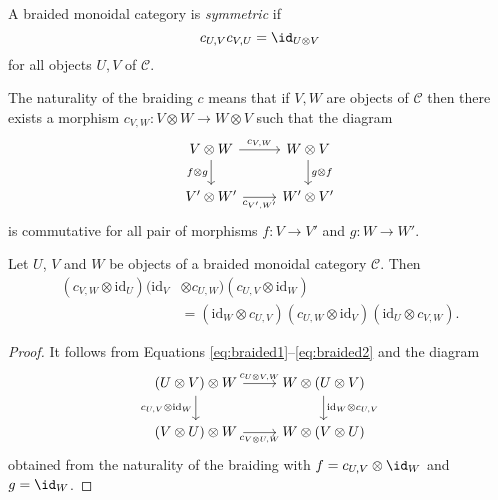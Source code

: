 \documentclass[12pt]{amsproc}
\newcommand{\ydH}{\prescript{H}{H}{\mathcal{YD}}}
\begin{document}
\begin{definition}
A braided monoidal category is \emph{symmetric} if 
\[
c_{U,V}c_{V,U}=\id_{U\otimes V}
\]
for all objects $U,V$ of $\mathcal{C}$.
\end{definition}

The naturality of the braiding $c$ means that if $V,W$ are objects
of $\mathcal{C}$ then there exists a morphism $c_{V,W}:V\otimes W\to W\otimes V$
such that the diagram 
\[
\begin{tikzcd}
V \otimes W \arrow[d, "f \otimes g"'] \arrow[r, "c_{V,W}"] & W \otimes V \arrow[d, "g \otimes f"] \\
V' \otimes W' \arrow[r, "c_{V',W'}"'] & W' \otimes V'
\end{tikzcd}
\]
is commutative for all pair of morphisms $f:V\to V'$ and $g:W\to W'$.

\begin{proposition}
Let $U$, $V$ and $W$ be objects of a braided monoidal category $\mathcal{C}$.
Then 
\begin{align*}
(c_{V,W}\otimes\textrm{id}_{U})(\textrm{id}_{V}&\otimes c_{U,W})(c_{U,V}\otimes\textrm{id}_{W})\\
&=(\textrm{id}_{W}\otimes c_{U,V})(c_{U,W}\otimes\textrm{id}_{V})(\textrm{id}_{U}\otimes c_{V,W}).
\end{align*}
\end{proposition}

\begin{proof}
It follows from Equations \eqref{eq:braided1}--\eqref{eq:braided2} and the
diagram
\[
\begin{tikzcd}
(U \otimes V) \otimes W \arrow[d, "c_{U,V} \otimes \mathrm{id}_W"'] \arrow[r, "c_{U \otimes V, W}"] 
  & W \otimes (U \otimes V) \arrow[d, "\mathrm{id}_W \otimes c_{U,V}"] \\
(V \otimes U) \otimes W \arrow[r, "c_{V \otimes U, W}"'] 
  & W \otimes (V \otimes U)
\end{tikzcd}
\]
obtained from the naturality of the braiding with
$f=c_{U,V}\otimes\id_W$ and $g=\id_W$.
\end{proof}

\end{document}
